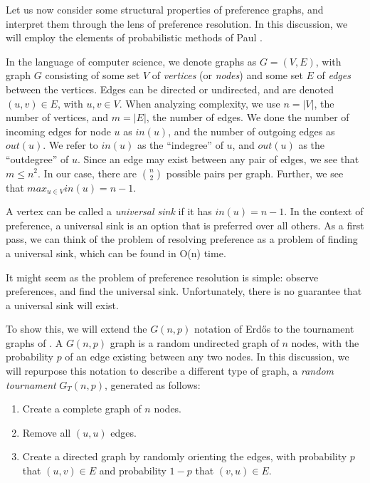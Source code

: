 Let us now consider some structural properties of preference graphs, and interpret them through the lens of preference resolution.
In this discussion, we will employ the elements of probabilistic methods of Paul \cite{erdos:1959}.

\bigskip

In the language of computer science, we denote graphs as $G = (V, E)$, with graph $G$ consisting of some set $V$ of \textit{vertices} (or \textit{nodes}) and some set $E$ of \textit{edges} between the vertices.
Edges can be directed or undirected, and are denoted $(u,v) \in E$, with $u, v \in V$.
When analyzing complexity, we use $n = |V|$, the number of vertices, and $m = |E|$, the number of edges.
We done the number of incoming edges for node $u$ as $in(u)$, and the number of outgoing edges as $out(u)$.
We refer to $in(u)$ as the ``indegree'' of $u$, and $out(u)$ as the ``outdegree'' of $u$.
Since an edge may exist between any pair of edges, we see that $m \leq n^2$.
In our case, there are ${n}\choose{2}$ possible pairs per graph.
Further, we see that $max_{u \in V}in(u) = n - 1$.

A vertex can be called a \textit{universal sink} if it has $in(u) = n - 1$.
In the context of preference, a universal sink is an option that is preferred over all others.
As a first pass, we can think of the problem of resolving preference as a problem of finding a universal sink, which can be found in O(n) time.

It might seem as the problem of preference resolution is simple: observe preferences, and find the universal sink.
Unfortunately, there is no guarantee that a universal sink will exist.

\bigskip

To show this, we will extend the $G(n,p)$ notation of Erd{\H o}s to the tournament graphs of \cite{landau:1953}.
A $G(n,p)$ graph is a random undirected graph of $n$ nodes, with the probability $p$ of an edge existing between any two nodes.
In this discussion, we will repurpose this notation to describe a different type of graph, a \textit{random tournament} $G_T(n,p)$, generated as follows:

\begin{enumerate}
	\item Create a complete graph of $n$ nodes.
	\item Remove all $(u,u)$ edges.
	\item Create a directed graph by randomly orienting the edges, with probability $p$ that $(u, v) \in E$ and probability $1-p$ that $(v, u) \in E$.
\end{enumerate}

